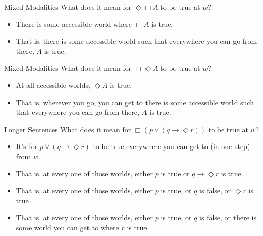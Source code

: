 \documentclass[
  14pt,
  letterpaper,
  ignorenonframetext,
  aspectratio=169,
  handout]{beamer}
\providecommand{\tightlist}{%
  \setlength{\itemsep}{0pt}\setlength{\parskip}{0pt}}\usepackage{longtable,booktabs,array}
\begin{document}
\begin{frame}{Mixed Modalities}
\protect\hypertarget{mixed-modalities}{}
What does it mean for \(\Diamond \Box A\) to be true at \(w\)?

\begin{itemize}[<+->]
\tightlist
\item
  There is some accessible world where \(\Box A\) is true.
\item
  That is, there is some accessible world such that everywhere you can
  go from there, \(A\) is true.
\end{itemize}
\end{frame}

\begin{frame}{Mixed Modalities}
\protect\hypertarget{mixed-modalities-1}{}
What does it mean for \(\Box \Diamond A\) to be true at \(w\)?

\begin{itemize}[<+->]
\tightlist
\item
  At all accessible worlds, \(\Diamond A\) is true.
\item
  That is, wherever you go, you can get to there is some accessible
  world such that everywhere you can go from there, \(A\) is true.
\end{itemize}
\end{frame}

\begin{frame}{Longer Sentences}
\protect\hypertarget{longer-sentences}{}
What does it mean for \(\Box(p \vee (q \rightarrow \Diamond r))\) to be
true at \(w\)?

\begin{itemize}[<+->]
\tightlist
\item
  It's for \(p \vee (q \rightarrow \Diamond r)\) to be true everywhere
  you can get to (in one step) from \(w\).
\item
  That is, at every one of those worlds, either \(p\) is true or
  \(q \rightarrow \Diamond r\) is true.
\item
  That is, at every one of those worlds, either \(p\) is true, or \(q\)
  is false, or \(\Diamond r\) is true.
\item
  That is, at every one of those worlds, either \(p\) is true, or \(q\)
  is false, or there is some world you can get to where \(r\) is true.
\end{itemize}
\end{frame}
\end{document}
